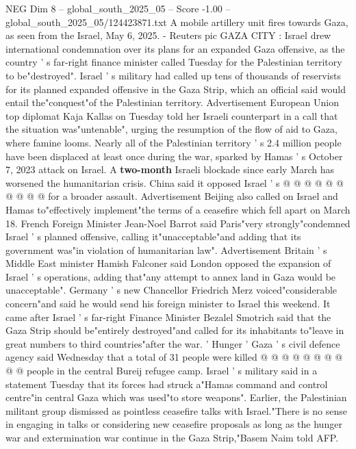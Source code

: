 \begin{textsample}{NEG Dim 8 – global\_south\_2025\_05 – Score -1.00 – global\_south\_2025\_05/124423871.txt}  \label{ex:f8_neg_020}
A mobile artillery unit fires towards Gaza, as seen from the Israel, May 6, 2025. - Reuters pic GAZA CITY : Israel drew international condemnation over its plans for an expanded Gaza offensive, as the country ' s far-right finance minister called Tuesday for the Palestinian territory to be"destroyed".
Israel ' s military had called up tens of thousands of reservists for its planned expanded offensive in the Gaza Strip, which an official said would entail the"conquest"of the Palestinian territory.
Advertisement European Union top diplomat Kaja Kallas on Tuesday told her Israeli counterpart in a call that the situation was"untenable", urging the resumption of the flow of aid to Gaza, where famine looms.
Nearly all of the Palestinian territory ' s 2.4 million people have been displaced at least once during the war, sparked by Hamas ' s October 7, 2023 attack on Israel.
A \textbf{two-month} Israeli blockade since early March has worsened the humanitarian crisis.
China said it opposed Israel ' s @ @ @ @ @ @ @ @ @ @ for a broader assault.
Advertisement Beijing also called on Israel and Hamas to"effectively implement"the terms of a ceasefire which fell apart on March 18.
French Foreign Minister Jean-Noel Barrot said Paris"very strongly"condemned Israel ' s planned offensive, calling it"unacceptable"and adding that its government was"in violation of humanitarian law".
Advertisement Britain ' s Middle East minister Hamish Falconer said London opposed the expansion of Israel ' s operations, adding that"any attempt to annex land in Gaza would be unacceptable".
Germany ' s new Chancellor Friedrich Merz voiced"considerable concern"and said he would send his foreign minister to Israel this weekend.
It came after Israel ' s far-right Finance Minister Bezalel Smotrich said that the Gaza Strip should be"entirely destroyed"and called for its inhabitants to"leave in great numbers to third countries"after the war. ' Hunger ' Gaza ' s civil defence agency said Wednesday that a total of 31 people were killed @ @ @ @ @ @ @ @ @ @ people in the central Bureij refugee camp.
Israel ' s military said in a statement Tuesday that its forces had struck a"Hamas command and control centre"in central Gaza which was used"to store weapons".
Earlier, the Palestinian militant group dismissed as pointless ceasefire talks with Israel."There is no sense in engaging in talks or considering new ceasefire proposals as long as the hunger war and extermination war continue in the Gaza Strip,"Basem Naim told AFP.

\end{textsample}
